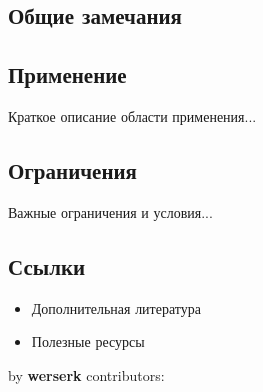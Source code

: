 \documentclass[10pt,landscape,a4paper]{article}
\begin{document}
\begin{multicols}{2}
\section{Общие замечания}

\subsection{Применение}
Краткое описание области применения...

\subsection{Ограничения}
Важные ограничения и условия...

\subsection{Ссылки}
\begin{itemize}
    \item Дополнительная литература
    \item Полезные ресурсы
\end{itemize}

\end{multicols}

{\noindent\color{accent}\tiny by \textbf{werserk} \hfill contributors: \texttt{\contributors}}
\end{document}
